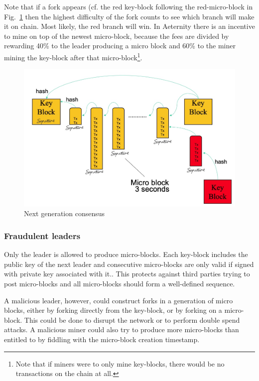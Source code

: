 Note that if a fork appears (cf. the red
key-block following the red-micro-block in Fig.\ \ref{ng-mining} then
the highest difficulty of the fork counts to see which branch will
make it on chain. Most likely, the red branch will win.
In Aeternity there is an incentive to mine
on top of the newest micro-block, because the fees are divided by rewarding 40\%
to the leader producing a micro block and 60\% to the miner mining the key-block after that
micro-block\footnote{Note that if miners
  were to only mine key-blocks, there would be no transactions on the
  chain at all.}.

\begin{figure}
   \includegraphics[scale=0.3]{keymicro.jpg}
   \caption{Next generation consensus}
   \label{ng-mining}
\end{figure}

\subsubsection{Fraudulent leaders}

Only the leader is allowed to produce micro-blocks. Each key-block
includes the  public key of the next leader and consecutive micro-blocks are only valid
if signed with private key associated with it.. This protects against third parties trying
to post micro-blocks and all micro-blocks should form a well-defined
sequence.

A malicious leader, however, could construct forks in a generation of micro
blocks, either by forking directly from the key-block, or by forking
on a micro-block. This could be done to disrupt the network or to
perform double spend attacks. A malicious miner could also try to
produce more micro-blocks than entitled to by fiddling with the
micro-block creation timestamp.

